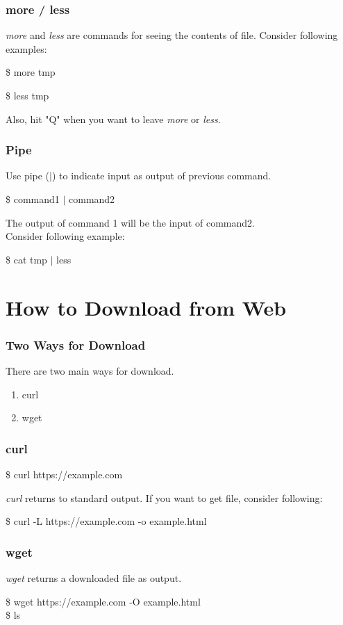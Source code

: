 \documentclass{beamer}
\begin{document}
	\begin{frame}
		\frametitle{more / less}
		\textit{more} and \textit{less} are commands for seeing the contents of file.
		Consider following examples:
		\begin{example}
			\$ more tmp
		\end{example}

		\begin{example}
			\$ less tmp
		\end{example}

		Also, hit "Q" when you want to leave \textit{more} or \textit{less}.
	\end{frame}

	\begin{frame}
		\frametitle{Pipe}
		Use pipe ($|$) to indicate input as output of previous command.
		\begin{example}
			\$ command1 $|$ command2
		\end{example}
		The output of command 1 will be the input of command2. \\
		Consider following example:
		\begin{example}
			\$ cat tmp $|$ less
		\end{example}
	\end{frame}

	\section{How to Download from Web}

	\begin{frame}
		\frametitle{Two Ways for Download}
		There are two main ways for download.
		\begin{enumerate}
			\item curl
			\item wget
		\end{enumerate}
	\end{frame}

	\begin{frame}
		\frametitle{curl}
		\begin{example}
			\$ curl https://example.com
		\end{example}
		\textit{curl} returns to standard output. If you want to get file, consider following:
		\begin{example}
			\$ curl -L https://example.com -o example.html
		\end{example}
	\end{frame}

	\begin{frame}
		\frametitle{wget}
		\textit{wget} returns a downloaded file as output.
		\begin{example}
			\$ wget https://example.com -O example.html \\
			\$ ls
		\end{example}
	\end{frame}
\end{document}

